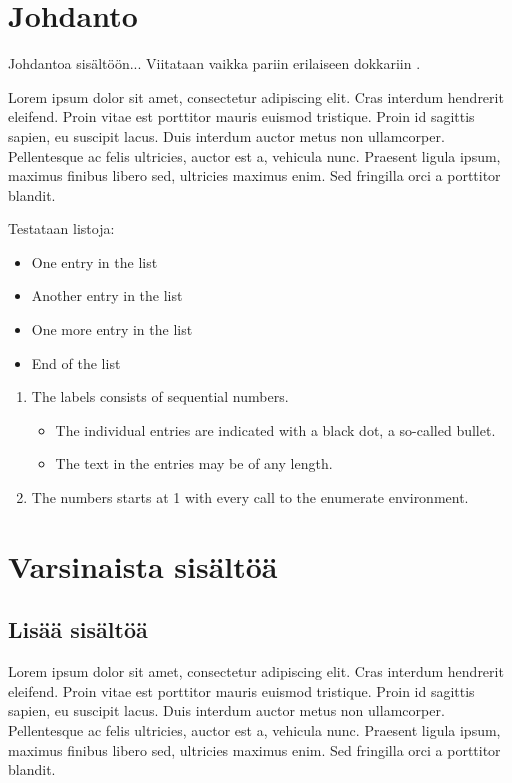 \section{Johdanto}

Johdantoa sisältöön...
Viitataan vaikka pariin \parencite{vahakainu_et_al} erilaiseen \parencite{maenpaa_peltola} dokkariin \parencite{wahle_et_al}.

Lorem ipsum dolor sit amet, consectetur adipiscing elit. Cras interdum hendrerit eleifend. Proin vitae est porttitor mauris euismod tristique. Proin id sagittis sapien, eu suscipit lacus. Duis interdum auctor metus non ullamcorper. Pellentesque ac felis ultricies, auctor est a, vehicula nunc. Praesent ligula ipsum, maximus finibus libero sed, ultricies maximus enim. Sed fringilla orci a porttitor blandit.

Testataan listoja:
\begin{itemize}
  \item One entry in the list
  \item Another entry in the list
  \item One more entry in the list
  \item End of the list
\end{itemize}
\begin{enumerate}
   \item The labels consists of sequential numbers.
   \begin{itemize}
     \item The individual entries are indicated with a black dot, a so-called bullet.
     \item The text in the entries may be of any length.
   \end{itemize}
   \item The numbers starts at 1 with every call to the enumerate environment.
\end{enumerate}


\section{Varsinaista sisältöä}

\subsection{Lisää sisältöä}

Lorem ipsum dolor sit amet, consectetur adipiscing elit. Cras interdum hendrerit eleifend. Proin vitae est porttitor mauris euismod tristique. Proin id sagittis sapien, eu suscipit lacus. Duis interdum auctor metus non ullamcorper. Pellentesque ac felis ultricies, auctor est a, vehicula nunc. Praesent ligula ipsum, maximus finibus libero sed, ultricies maximus enim. Sed fringilla orci a porttitor blandit.

